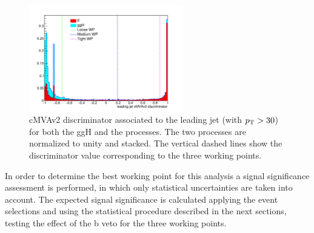\begin{figure}[htb]
\centering
\includegraphics[width=0.6\textwidth]{images/13TeV/cmva_WP.pdf}
\caption{cMVAv2 discriminator associated to the leading jet (with $p_\mathrm{T} > 30$\GeV) for both the ggH and the \ttbar processes. The two processes are normalized to unity and stacked. The vertical dashed lines show the discriminator value corresponding to the three working points.}\label{fig:discriminator}
\end{figure}

In order to determine the best working point for this analysis a signal significance assessment is performed, in which only statistical uncertainties are taken into account. The expected signal significance is calculated applying the event selections and using the statistical procedure described in the next sections, testing the effect of the b veto for the three working points.

